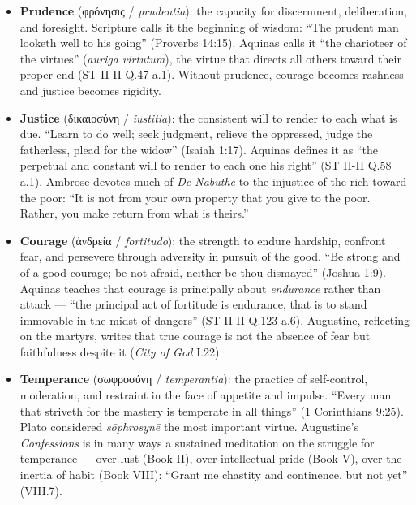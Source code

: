 \documentclass[10pt, letterpaper, twocolumn]{article}
\providecommand{\tightlist}{\setlength{\itemsep}{0pt}\setlength{\parskip}{0pt}}
\begin{document}
\begin{itemize}
\tightlist
\item
  \textbf{Prudence} (φρόνησις / \emph{prudentia}): the capacity for discernment, deliberation, and foresight. Scripture calls it the beginning of wisdom: ``The prudent man looketh well to his going'' (Proverbs 14:15). Aquinas calls it ``the charioteer of the virtues'' (\emph{auriga virtutum}), the virtue that directs all others toward their proper end (ST II-II Q.47 a.1). Without prudence, courage becomes rashness and justice becomes rigidity.
\item
  \textbf{Justice} (δικαιοσύνη / \emph{iustitia}): the consistent will to render to each what is due. ``Learn to do well; seek judgment, relieve the oppressed, judge the fatherless, plead for the widow'' (Isaiah 1:17). Aquinas defines it as ``the perpetual and constant will to render to each one his right'' (ST II-II Q.58 a.1). Ambrose devotes much of \emph{De Nabuthe} to the injustice of the rich toward the poor: ``It is not from your own property that you give to the poor. Rather, you make return from what is theirs.''
\item
  \textbf{Courage} (ἀνδρεία / \emph{fortitudo}): the strength to endure hardship, confront fear, and persevere through adversity in pursuit of the good. ``Be strong and of a good courage; be not afraid, neither be thou dismayed'' (Joshua 1:9). Aquinas teaches that courage is principally about \emph{endurance} rather than attack --- ``the principal act of fortitude is endurance, that is to stand immovable in the midst of dangers'' (ST II-II Q.123 a.6). Augustine, reflecting on the martyrs, writes that true courage is not the absence of fear but faithfulness despite it (\emph{City of God} I.22).
\item
  \textbf{Temperance} (σωφροσύνη / \emph{temperantia}): the practice of self-control, moderation, and restraint in the face of appetite and impulse. ``Every man that striveth for the mastery is temperate in all things'' (1 Corinthians 9:25). Plato considered \emph{sōphrosynē} the most important virtue. Augustine's \emph{Confessions} is in many ways a sustained meditation on the struggle for temperance --- over lust (Book II), over intellectual pride (Book V), over the inertia of habit (Book VIII): ``Grant me chastity and continence, but not yet'' (VIII.7).
\end{itemize}
\end{document}

